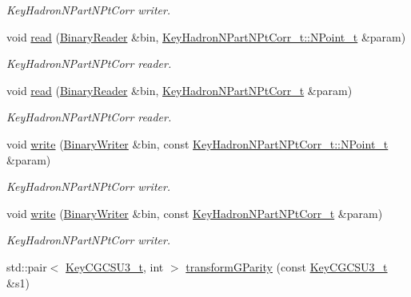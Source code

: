 \begin{DoxyCompactItemize}
\begin{DoxyCompactList}\small\item\em Key\+Hadron\+N\+Part\+N\+Pt\+Corr writer. \end{DoxyCompactList}\item 
void \mbox{\hyperlink{namespaceHadron_a9478eee791b9cb2c8523893a334602e2}{read}} (\mbox{\hyperlink{classADATIO_1_1BinaryReader}{Binary\+Reader}} \&bin, \mbox{\hyperlink{structHadron_1_1KeyHadronNPartNPtCorr__t_1_1NPoint__t}{Key\+Hadron\+N\+Part\+N\+Pt\+Corr\+\_\+t\+::\+N\+Point\+\_\+t}} \&param)
\begin{DoxyCompactList}\small\item\em Key\+Hadron\+N\+Part\+N\+Pt\+Corr reader. \end{DoxyCompactList}\item 
void \mbox{\hyperlink{namespaceHadron_a51412e3f2ebc9c4d67ed1cc397c4d546}{read}} (\mbox{\hyperlink{classADATIO_1_1BinaryReader}{Binary\+Reader}} \&bin, \mbox{\hyperlink{structHadron_1_1KeyHadronNPartNPtCorr__t}{Key\+Hadron\+N\+Part\+N\+Pt\+Corr\+\_\+t}} \&param)
\begin{DoxyCompactList}\small\item\em Key\+Hadron\+N\+Part\+N\+Pt\+Corr reader. \end{DoxyCompactList}\item 
void \mbox{\hyperlink{namespaceHadron_aef02c5c2c485a766d9e66d0dabe73f62}{write}} (\mbox{\hyperlink{classADATIO_1_1BinaryWriter}{Binary\+Writer}} \&bin, const \mbox{\hyperlink{structHadron_1_1KeyHadronNPartNPtCorr__t_1_1NPoint__t}{Key\+Hadron\+N\+Part\+N\+Pt\+Corr\+\_\+t\+::\+N\+Point\+\_\+t}} \&param)
\begin{DoxyCompactList}\small\item\em Key\+Hadron\+N\+Part\+N\+Pt\+Corr writer. \end{DoxyCompactList}\item 
void \mbox{\hyperlink{namespaceHadron_adfbaeaa21e67fb5560f0cf7bddc6ce70}{write}} (\mbox{\hyperlink{classADATIO_1_1BinaryWriter}{Binary\+Writer}} \&bin, const \mbox{\hyperlink{structHadron_1_1KeyHadronNPartNPtCorr__t}{Key\+Hadron\+N\+Part\+N\+Pt\+Corr\+\_\+t}} \&param)
\begin{DoxyCompactList}\small\item\em Key\+Hadron\+N\+Part\+N\+Pt\+Corr writer. \end{DoxyCompactList}\item 
std\+::pair$<$ \mbox{\hyperlink{structHadron_1_1KeyCGCSU3__t}{Key\+C\+G\+C\+S\+U3\+\_\+t}}, int $>$ \mbox{\hyperlink{namespaceHadron_ae0f88dc43657f9dd4f118d41608859cc}{transform\+G\+Parity}} (const \mbox{\hyperlink{structHadron_1_1KeyCGCSU3__t}{Key\+C\+G\+C\+S\+U3\+\_\+t}} \&s1)

\end{DoxyCompactItemize}
